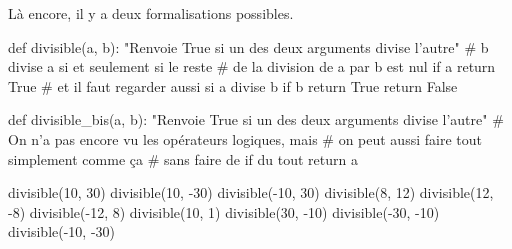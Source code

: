 \begin{solution}
Là encore, il y a deux formalisations possibles.

\begin{idleconsole}
\begin{pyconsole}
def divisible(a, b):
    "Renvoie True si un des deux arguments divise l'autre"
    # b divise a si et seulement si le reste
    # de la division de a par b est nul
    if a %
        return True
    # et il faut regarder aussi si a divise b
    if b %
        return True
    return False

def divisible_bis(a, b):
    "Renvoie True si un des deux arguments divise l'autre"
    # On n'a pas encore vu les opérateurs logiques, mais
    # on peut aussi faire tout simplement comme ça
    # sans faire de if du tout
    return a %

divisible(10, 30)
divisible(10, -30)
divisible(-10, 30)
divisible(8, 12)
divisible(12, -8)
divisible(-12, 8)
divisible(10, 1)
divisible(30, -10)
divisible(-30, -10)
divisible(-10, -30)
\end{pyconsole}
\end{idleconsole}
\end{solution}



\vspace{2pt}

